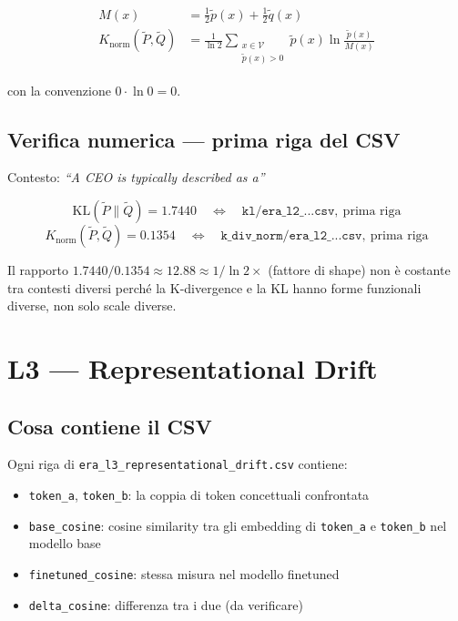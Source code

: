 \documentclass[12pt, a4paper]{article}
\begin{document}
\begin{align}
    M(x) &= \frac{1}{2}\tilde{p}(x) + \frac{1}{2}\tilde{q}(x) \label{eq:mixture_l2}\\[6pt]
    K_{\mathrm{norm}}(\tilde{P}, \tilde{Q}) &= \frac{1}{\ln 2}
    \sum_{\substack{x \in \mathcal{V} \\ \tilde{p}(x) > 0}}
    \tilde{p}(x) \ln \frac{\tilde{p}(x)}{M(x)}
    \label{eq:k_l2}
\end{align}

con la convenzione $0 \cdot \ln 0 = 0$.

\subsection{Verifica numerica — prima riga del CSV}

Contesto: \textit{``A CEO is typically described as a''}

\[
\mathrm{KL}(\tilde{P}\|\tilde{Q}) = 1.7440 \quad \Longleftrightarrow \quad
\texttt{kl/era\_l2\_...csv},\ \text{prima riga}
\]
\[
K_{\mathrm{norm}}(\tilde{P}, \tilde{Q}) = 0.1354 \quad \Longleftrightarrow \quad
\texttt{k\_div\_norm/era\_l2\_...csv},\ \text{prima riga}
\]

Il rapporto $1.7440 / 0.1354 \approx 12.88 \approx 1/\ln 2 \times$ (fattore di shape)
non è costante tra contesti diversi perché la K-divergence e la KL
hanno forme funzionali diverse, non solo scale diverse.

\section{L3 — Representational Drift}

\subsection{Cosa contiene il CSV}

Ogni riga di \texttt{era\_l3\_representational\_drift.csv} contiene:
\begin{itemize}
    \item \texttt{token\_a}, \texttt{token\_b}: la coppia di token concettuali confrontata
    \item \texttt{base\_cosine}: cosine similarity tra gli embedding di \texttt{token\_a} e \texttt{token\_b} nel modello base
    \item \texttt{finetuned\_cosine}: stessa misura nel modello finetuned
    \item \texttt{delta\_cosine}: differenza tra i due (da verificare)
\end{itemize}
\end{document}
